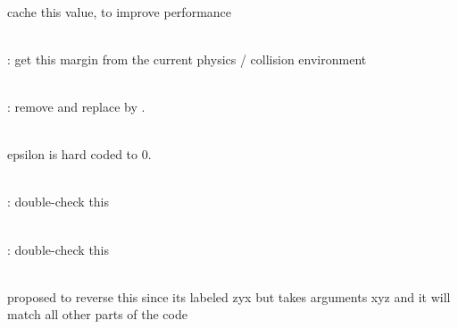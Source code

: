 \begin{DoxyRefList}
\item[Member \doxylink{bt_collision_shape_8h_ab61345d8885b5d1afc6980b817ddf39e}{get\+Angular\+Motion\+Disc} () const]\hfill \\
\label{todo__todo000019}%
%
cache this value, to improve performance  
\item[Member \doxylink{bt_persistent_manifold_8h_ab32e1bb80b3587346f86dd6621791784}{get\+Contact\+Breaking\+Threshold} () const]\hfill \\
\label{todo__todo000026}%
%
\+: get this margin from the current physics / collision environment  
\item[Class \doxylink{class_g_i_m___c_o_n_t_a_c_t}{GIM\+\_\+\+CONTACT} ]\hfill \\
\label{todo__todo000025}%
%
\+: remove and replace  by .  
\item[Member \doxylink{group__gtx__vector__angle_ga9556a803dce87fe0f42fdabe4ebba1d5}{glm\+::oriented\+Angle} (vec$<$ 2, T, Q $>$ const \&x, vec$<$ 2, T, Q $>$ const \&y)]\hfill \\
\label{todo__todo000045}%
%
epsilon is hard coded to 0.  
\item[Member \doxylink{b3_quantized_bvh_8h_a13ca4a67063f4affe28dd3d15367c16a}{quantize} (unsigned short \texorpdfstring{$\ast$}{*}out, const b3\+Vector3 \&point, int is\+Max) const]\hfill \\
\label{todo__todo000006}%
%
\+: double-\/check this  
\item[Member \doxylink{bt_quantized_bvh_8h_a1650eacc880edbe57347d2622d9327c3}{quantize} (unsigned short \texorpdfstring{$\ast$}{*}out, const bt\+Vector3 \&point, int is\+Max) const]\hfill \\
\label{todo__todo000009}%
%
\+: double-\/check this  
\item[Member \doxylink{b3_matrix3x3_8h_aeaf1cf757a7b4995805b44ff167dbd51}{set\+Euler\+ZYX} (\doxylink{b3_scalar_8h_ac6f45f3fb4d0d50710cdaa55e5ddd6ac}{b3\+Scalar} eulerX, \doxylink{b3_scalar_8h_ac6f45f3fb4d0d50710cdaa55e5ddd6ac}{b3\+Scalar} eulerY, \doxylink{b3_scalar_8h_ac6f45f3fb4d0d50710cdaa55e5ddd6ac}{b3\+Scalar} eulerZ)]\hfill \\
\label{todo__todo000001}%
%
proposed to reverse this since it\textquotesingle{}s labeled zyx but takes arguments xyz and it will match all other parts of the code  

\end{DoxyRefList}
